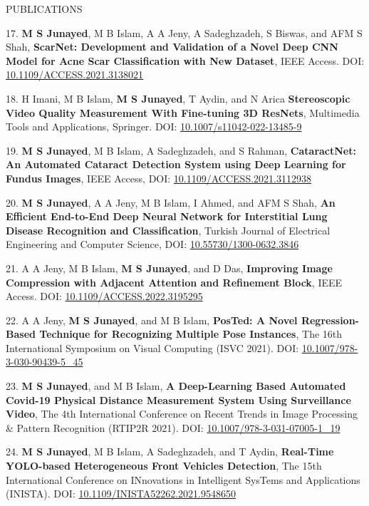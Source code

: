 \begin{rSection}{ PUBLICATIONS}
{{17. {\bf M S Junayed}, M B Islam, A A Jeny, A Sadeghzadeh, S Biswas, and AFM S Shah, {\bf{ScarNet: Development and Validation of a Novel Deep CNN Model for Acne Scar Classification with New Dataset}}, IEEE Access. DOI: {\href{https://ieeexplore.ieee.org/document/9661390}{10.1109/ACCESS.2021.3138021}}}

{18. H Imani, M B Islam, {\bf M S Junayed},  T Aydin, and N Arica {\bf{Stereoscopic Video Quality Measurement With Fine-tuning 3D ResNets}}, Multimedia Tools and Applications, Springer. DOI: {\href{https://link.springer.com/article/10.1007/s11042-022-13485-9}{10.1007/s11042-022-13485-9}}}

{19. {\bf M S Junayed}, M B Islam, A Sadeghzadeh, and  S Rahman, {\bf{CataractNet: An Automated Cataract Detection System using Deep Learning for Fundus Images}}, IEEE Access, DOI: {\href{https://ieeexplore.ieee.org/document/9539231}{10.1109/ACCESS.2021.3112938}}}

{20. {\bf M S Junayed}, A A Jeny, M B Islam, I Ahmed, and  AFM S Shah, {\bf{An Efficient End-to-End Deep Neural Network for Interstitial Lung Disease Recognition and Classification}}, Turkish Journal of Electrical Engineering and Computer Science, DOI: {\href{https://journals.tubitak.gov.tr/elektrik/vol30/iss4/6/}{10.55730/1300-0632.3846}}}

{21. A A Jeny, M B Islam, {\bf M S Junayed}, and D Das, {\bf{Improving Image Compression with Adjacent Attention and Refinement Block}}, IEEE Access. DOI: {\href{https://ieeexplore.ieee.org/abstract/document/9845406}{10.1109/ACCESS.2022.3195295}}}

{22. A A Jeny, {\bf M S Junayed}, and M B Islam, {\bf{PosTed: A Novel Regression-Based Technique for Recognizing Multiple Pose Instances}}, The 16th International Symposium on Visual Computing (ISVC 2021). DOI: {\href{https://link.springer.com/chapter/10.1007/978-3-030-90439-5_45}{10.1007/978-3-030-90439-5\_45}}

{23. {\bf M S Junayed}, and M B Islam, {\bf{A Deep-Learning Based Automated Covid-19 Physical Distance Measurement System Using Surveillance Video}}, The 4th International Conference on Recent Trends in Image Processing \& Pattern Recognition (RTIP2R 2021). DOI: {\href{https://link.springer.com/chapter/10.1007/978-3-031-07005-1_19}{10.1007/978-3-031-07005-1\_19}}

{24. {\bf M S Junayed}, M B Islam, A Sadeghzadeh, and T Aydin, {\bf{Real-Time YOLO-based Heterogeneous Front Vehicles Detection}}, The 15th International Conference on INnovations in Intelligent SysTems and Applications (INISTA). DOI: {\href{https://ieeexplore.ieee.org/document/9548650}{10.1109/INISTA52262.2021.9548650}}

}}}}
\end{rSection}
